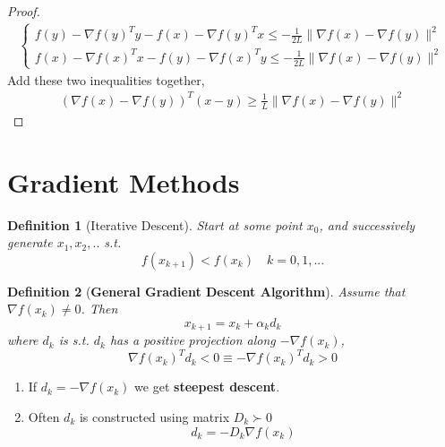 \documentclass[11pt,a4paper]{article}
\newtheorem{definition}{Definition}
\begin{document}
\begin{proof}
\begin{equation}
    \begin{aligned}
        \left\{\begin{matrix}
            f(y)-\nabla f(y)^Ty-f(x)-\nabla f(y)^Tx\leq -\frac{1}{2L}\|\nabla f(x)-\nabla f(y)\|^2\\
            f(x)-\nabla f(x)^Tx-f(y)-\nabla f(x)^Ty\leq -\frac{1}{2L}\|\nabla f(x)-\nabla f(y)\|^2
        \end{matrix}\right.
    \end{aligned}
    \nonumber
\end{equation}
Add these two inequalities together,
\begin{equation}
    \begin{aligned}
        (\nabla f(x)-\nabla f(y))^T(x-y)\geq \frac{1}{L}\|\nabla f(x)-\nabla f(y)\|^2
    \end{aligned}
    \nonumber
\end{equation}
\end{proof}















\section{Gradient Methods}
\begin{definition}[Iterative Descent]
Start at some point $x_0$, and successively generate $x_1,x_2,..$ s.t. $$f(x_{k+1})<f(x_k)\quad k=0,1,...$$
\end{definition}

\begin{definition}[\textbf{General Gradient Descent Algorithm}]
    Assume that $\nabla f(x_k)\neq 0$. Then
    $$x_{k+1}=x_k+\alpha_k d_k$$
    where $d_k$ is s.t. $d_k$ has a positive projection along $-\nabla f(x_k)$,
    $$\nabla f(x_k)^T d_k<0 \equiv -\nabla f(x_k)^T d_k>0$$
\end{definition}
\begin{enumerate}[$\bullet$]
    \item If $d_k=-\nabla f(x_k)$ we get \textbf{steepest descent}.
    \item Often $d_k$ is constructed using matrix $D_k \succ 0$ $$d_k=-D_k\nabla f(x_k)$$
\end{enumerate}
\end{document}
